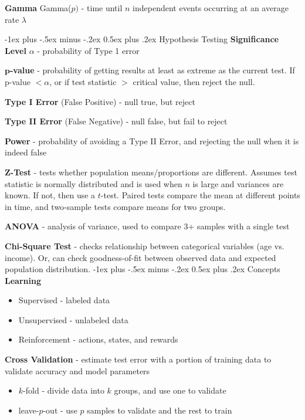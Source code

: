 \documentclass[10pt,landscape]{article}
\makeatletter
\renewcommand{\section}{\@startsection{section}{1}{0mm}%
                                {-1ex plus -.5ex minus -.2ex}%
                                {0.5ex plus .2ex}%
                                {\normalfont\large\bfseries}}
\renewcommand{\subsection}{\@startsection{subsection}{2}{0mm}%
                                {-1ex plus -.5ex minus -.2ex}%
                                {0.5ex plus .2ex}%
                                {\normalfont\normalsize\bfseries}}
\makeatother
\begin{document}
\begin{multicols}{3}
\textbf{Gamma} Gamma($p)$ - time until $n$ independent events occurring at an average rate $\lambda$ 

\subsection{Hypothesis Testing}
\textbf{Significance Level} $\alpha$ - probability of Type 1 error 

$\boldsymbol p$\textbf{-value} - probability of getting results at least as extreme as the current test. If p-value $<\alpha$, or if test statistic $>$ critical value, then reject the null.

\textbf{Type I Error} (False Positive) - null true, but reject  

\textbf{Type II  Error} (False Negative)  - null false, but fail to reject

\textbf{Power} - probability of avoiding a Type II Error, and rejecting the null when it is indeed false

\textbf{Z-Test} - tests whether population means/proportions are different. Assumes test statistic is normally distributed and is used when $n$ is large and variances are known. If not, then use a $t$-test. Paired tests compare the mean at different points in time, and two-sample tests compare means for two groups.

\textbf{ANOVA} - analysis of variance, used to compare 3+ samples with a single test

\textbf{Chi-Square Test} - checks relationship between categorical variables (age vs. income). Or, can check goodness-of-fit between observed data and expected population distribution. 
\section{Concepts}
\textbf{Learning}

\begin{itemize}[label={--},leftmargin=4mm]
\itemsep -.4mm 
\vspace{-1.5mm}
\item Supervised - labeled data
\item Unsupervised - unlabeled data
\item Reinforcement - actions, states, and rewards 
\end{itemize}


\textbf{Cross Validation} - estimate test error with a portion of training data to validate accuracy and model parameters
\begin{itemize}[label={--},leftmargin=4mm]
\itemsep -.4mm 
\vspace{-1mm}
\item $k$-fold - divide data into $k$ groups, and use one to validate
\item leave-$p$-out  - use $p$ samples to validate and the rest to train
\end{itemize}


\end{multicols}
\end{document}

